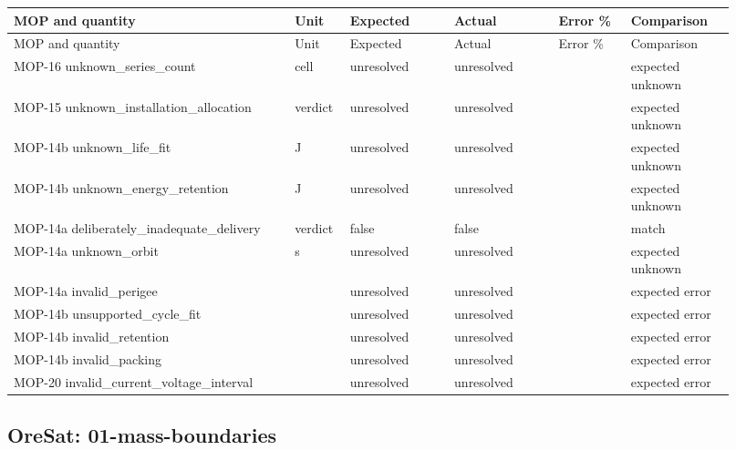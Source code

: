 \begingroup\scriptsize\setlength{\tabcolsep}{2pt}\setlength{\parskip}{0pt}
\begin{longtable}{@{}>{\raggedright\arraybackslash}p{0.3588\linewidth} >{\raggedright\arraybackslash}p{0.0552\linewidth} >{\raggedright\arraybackslash}p{0.138\linewidth} >{\raggedright\arraybackslash}p{0.138\linewidth} >{\raggedright\arraybackslash}p{0.09200000000000001\linewidth} >{\raggedright\arraybackslash}p{0.138\linewidth}@{}}
\toprule
MOP and quantity & Unit & Expected & Actual & Error \% & Comparison \\ \midrule
\endfirsthead
\toprule
MOP and quantity & Unit & Expected & Actual & Error \% & Comparison \\ \midrule
\endhead
\bottomrule\endfoot
MOP-16 unknown\_\allowbreak{}series\_\allowbreak{}count & cell & unresolved & unresolved &  & expected unknown \\
MOP-15 unknown\_\allowbreak{}installation\_\allowbreak{}allocation & verdict & unresolved & unresolved &  & expected unknown \\
MOP-14b unknown\_\allowbreak{}life\_\allowbreak{}fit & J & unresolved & unresolved &  & expected unknown \\
MOP-14b unknown\_\allowbreak{}energy\_\allowbreak{}retention & J & unresolved & unresolved &  & expected unknown \\
MOP-14a deliberately\_\allowbreak{}inadequate\_\allowbreak{}delivery & verdict & false & false &  & match \\
MOP-14a unknown\_\allowbreak{}orbit & s & unresolved & unresolved &  & expected unknown \\
MOP-14a invalid\_\allowbreak{}perigee &  & unresolved & unresolved &  & expected error \\
MOP-14b unsupported\_\allowbreak{}cycle\_\allowbreak{}fit &  & unresolved & unresolved &  & expected error \\
MOP-14b invalid\_\allowbreak{}retention &  & unresolved & unresolved &  & expected error \\
MOP-14b invalid\_\allowbreak{}packing &  & unresolved & unresolved &  & expected error \\
MOP-20 invalid\_\allowbreak{}current\_\allowbreak{}voltage\_\allowbreak{}interval &  & unresolved & unresolved &  & expected error \\
\end{longtable}\endgroup

\subsection{OreSat: 01-mass-boundaries}

